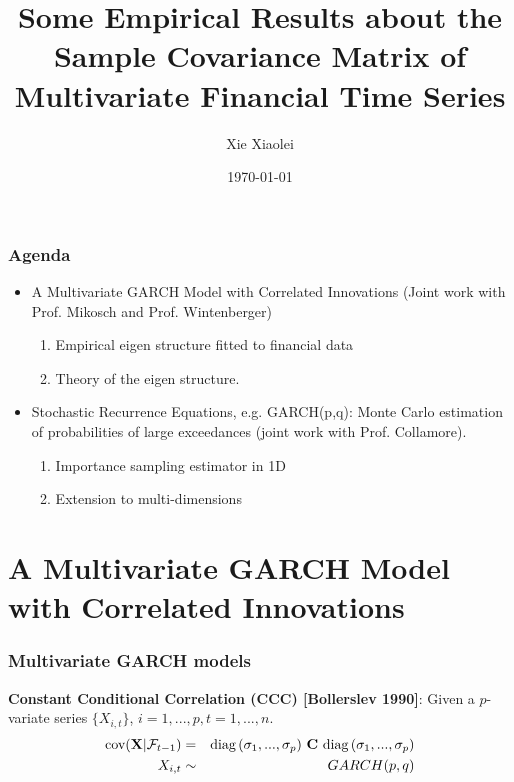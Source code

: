 \documentclass{beamer}
\title{Some Empirical Results about the Sample Covariance Matrix of
  Multivariate Financial Time Series}
\author{Xie Xiaolei} %
\institute[UCPH] %
{
University of Copenhagen \\ %
\medskip
\textit{xie@math.ku.dk} %
}
\date{\today} %
\begin{document}
\begin{frame}
\titlepage %
\end{frame}


\begin{frame}
  \frametitle{Agenda}
  \begin{itemize}
  \item A Multivariate GARCH Model with Correlated Innovations (Joint
    work with Prof. Mikosch and Prof. Wintenberger)
    \begin{enumerate}
    \item Empirical eigen structure fitted to financial data
    \item Theory of the eigen structure.
    \end{enumerate}
  \item Stochastic Recurrence Equations, e.g. GARCH(p,q): Monte Carlo
    estimation of probabilities of large exceedances (joint work with
    Prof. Collamore).
    \begin{enumerate}
    \item Importance sampling estimator in 1D
    \item Extension to multi-dimensions
    \end{enumerate}
  \end{itemize}
\end{frame}

\section{A Multivariate GARCH Model with Correlated Innovations}
\begin{frame}
  \frametitle{Multivariate GARCH models}
  {\bf Constant Conditional Correlation (CCC) [Bollerslev 1990]}:
  Given a $p$-variate series $\{X_{i, t}\}$, $i=1,...,p,
  t=1,...,n$.
  \begin{eqnarray*}
    \cov(\vec X | \mathcal F_{t-1}) &=&
    \diag(\sigma_1, ..., \sigma_p) \ 
    \mtx C \ 
    \diag(\sigma_1, ..., \sigma_p) \\
    X_{i, t} &\sim& GARCH(p,q)
  \end{eqnarray*}
\end{frame}
\end{document}
